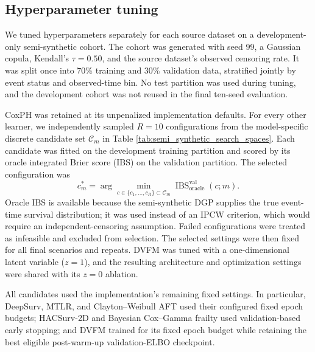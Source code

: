 \subsection{Hyperparameter tuning}
\label{app:hyperparameter_settings}

We tuned hyperparameters separately for each source dataset on a
development-only semi-synthetic cohort. The cohort was generated with seed 99,
a Gaussian copula, Kendall's $\tau=0.50$, and the source dataset's observed
censoring rate. It was split once into 70\% training and 30\% validation data,
stratified jointly by event status and observed-time bin. No test partition was
used during tuning, and the development cohort was not reused in the final
ten-seed evaluation.

CoxPH was retained at its unpenalized implementation defaults. For every other
learner, we independently sampled $R=10$ configurations from the
model-specific discrete candidate set $\mathcal{C}_m$ in Table
\ref{tab:semi_synthetic_search_spaces}. Each candidate was fitted on the
development training partition and scored by its oracle integrated Brier score
(IBS) on the validation partition. The selected configuration was
\[
  c_m^* = \arg\min_{c \in \{c_1,\ldots,c_R\} \subset \mathcal{C}_m}
  \operatorname{IBS}_{\mathrm{oracle}}^{\mathrm{val}}(c; m).
\]
Oracle IBS is available because the semi-synthetic DGP supplies the true
event-time survival distribution; it was used instead of an IPCW criterion,
which would require an independent-censoring assumption. Failed configurations
were treated as infeasible and excluded from selection. The selected settings
were then fixed for all final scenarios and repeats. DVFM was tuned with a
one-dimensional latent variable ($z=1$), and the resulting architecture and
optimization settings were shared with its $z=0$ ablation.

All candidates used the implementation's remaining fixed settings. In
particular, DeepSurv, MTLR, and Clayton--Weibull AFT used their configured
fixed epoch budgets; HACSurv-2D and Bayesian Cox--Gamma frailty used
validation-based early stopping; and DVFM trained for its fixed epoch budget
while retaining the best eligible post-warm-up validation-ELBO checkpoint.

